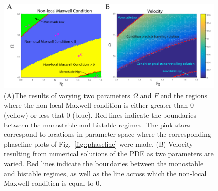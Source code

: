 \begin{figure}[h]
\centering
\captionsetup{width=.9\linewidth}
\includegraphics[width=6in]{Project2/figs/MM_results.pdf}
\caption{(A)The results of varying two parameters $\Omega$ and $F$ and the regions where the non-local Maxwell condition is either greater than $0$ (yellow) or less that $0$ (blue). Red lines indicate the boundaries between the monostable and bistable regimes. The pink stars correspond to locations in parameter space where the corresponding phaseline plots of Fig.~\ref{fig::phaseline} were made.  (B) Velocity resulting from numerical solutions of the PDE as two parameters are varied. Red lines indicate the boundaries between the monostable and bistable regimes, as well as the line across which the non-local Maxwell condition is equal to $0$.}
\label{fig::NLMC}
\end{figure}

